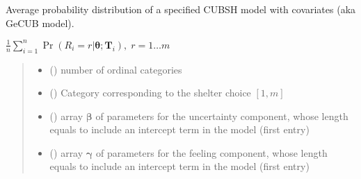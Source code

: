 \documentclass[letterpaper,10pt,english]{sphinxmanual}
\begin{document}
\begin{fulllineitems}
\label{\detokenize{cubmods:cubmods.cubsh_ywx.pmf}}
\pysigstartsignatures
{}
\pysigstopsignatures
\sphinxAtStartPar
Average probability distribution of a specified CUBSH model with covariates
(aka GeCUB model).

\sphinxAtStartPar
\(\frac{1}{n} \sum_{i=1}^n \Pr(R_i=r|\pmb\theta; \pmb T_i),\; r=1 \ldots m\)
\begin{quote}\begin{description}
\begin{itemize}
\item {} 
\sphinxAtStartPar
{} () \textendash{} number of ordinal categories

\item {} 
\sphinxAtStartPar
{} () \textendash{} Category corresponding to the shelter choice \([1,m]\)

\item {} 
\sphinxAtStartPar
{} () \textendash{} array \(\pmb \beta\) of parameters for the uncertainty component, whose length equals 
 to include an intercept term in the model (first entry)

\item {} 
\sphinxAtStartPar
{} () \textendash{} array \(\pmb \gamma\) of parameters for the feeling component, whose length equals 
 to include an intercept term in the model (first entry)


\end{itemize}
\end{description}
\end{quote}
\end{fulllineitems}
\end{document}
